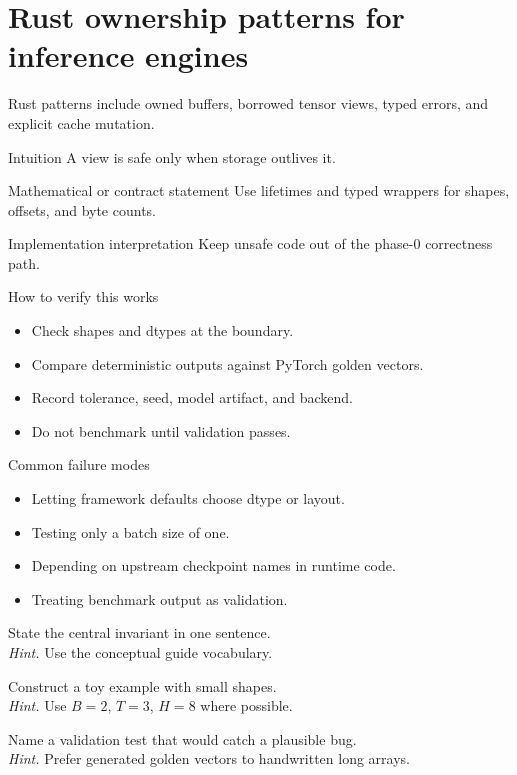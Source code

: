 \chapter{Rust ownership patterns for inference engines}
\label{app:rust-patterns}
Rust patterns include owned buffers, borrowed tensor views, typed errors, and explicit cache mutation. \citep{rustBook}



\begin{intuitionbox}{Intuition}
A view is safe only when storage outlives it.
\end{intuitionbox}

\begin{definitionbox}{Mathematical or contract statement}
Use lifetimes and typed wrappers for shapes, offsets, and byte counts.
\end{definitionbox}

\begin{implementationbox}{Implementation interpretation}
Keep unsafe code out of the phase-0 correctness path.
\end{implementationbox}

\begin{verificationbox}{How to verify this works}
\begin{itemize}
\item Check shapes and dtypes at the boundary.
\item Compare deterministic outputs against PyTorch golden vectors.
\item Record tolerance, seed, model artifact, and backend.
\item Do not benchmark until validation passes.
\end{itemize}
\end{verificationbox}

\begin{warningbox}{Common failure modes}
\begin{itemize}
\item Letting framework defaults choose dtype or layout.
\item Testing only a batch size of one.
\item Depending on upstream checkpoint names in runtime code.
\item Treating benchmark output as validation.
\end{itemize}
\end{warningbox}

\begin{chapterexercises}
\item State the central invariant in one sentence.\\
\textit{Hint.} Use the conceptual guide vocabulary.
\item Construct a toy example with small shapes.\\
\textit{Hint.} Use $B=2$, $T=3$, $H=8$ where possible.
\item Name a validation test that would catch a plausible bug.\\
\textit{Hint.} Prefer generated golden vectors to handwritten long arrays.
\end{chapterexercises}

